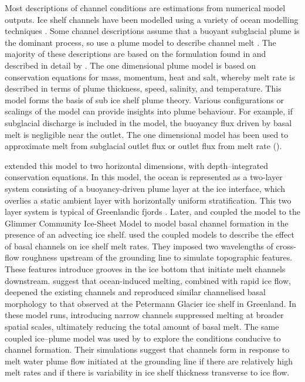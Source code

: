 Most descriptions of channel conditions are estimations from numerical model outputs.
Ice shelf channels have been modelled using a variety of ocean modelling techniques  \citep[e.g.][]{millgate2013effect,gladish2012ice,sergienko2013basal,payne2007numerical}. 
Some channel descriptions assume that a buoyant subglacial plume is the dominant process, so use a plume model to describe channel melt \citep[e.g.][]{gladish2012ice, sergienko2013basal}.
The majority of these descriptions are based on the formulation found in \cite{jenkins2011convection} and described in detail by \cite{hewitt2020subglacial}.
The \cite{jenkins2011convection} one dimensional plume model is based on conservation equations for mass, momentum, heat and salt, whereby melt rate is described in terms of plume thickness, speed, salinity, and temperature. This model forms the basis of sub ice shelf plume theory. Various configurations or scalings of the model can provide insights into plume behaviour. For example, if subglacial discharge is included in the model, the buoyancy flux driven by basal melt is negligible near the outlet. The one dimensional model has been used to approximate melt from subglacial outlet flux \cite[e.g.][]{gourmelen2017channelized} or outlet flux from melt rate (\cite[e.g.][]{marsh2016high}).

\cite{holland2006effects} extended this model to two horizontal dimensions, with depth--integrated conservation equations. In this model, the ocean is represented as a two-layer system consisting of a buoyancy-driven plume layer at the ice interface, which overlies a static  ambient layer with horizontally uniform stratification. This two layer system is typical of Greenlandic fjords \citep{hewitt2020subglacial}.
Later, \cite{gladish2012ice,dallaston2015channelization} and \cite{sergienko2013regular} coupled the model to the Glimmer Community Ice-Sheet Model \citep{rutt2009glimmer} to model basal channel formation in the presence of an advecting ice shelf.
\cite{gladish2012ice} used the coupled models to describe the effect of basal channels on ice shelf melt rates. They imposed two wavelengths of cross-flow  roughness upstream of the grounding line to simulate topographic features. These features introduce grooves in the ice bottom that initiate melt channels downstream. \cite{gladish2012ice} suggest that ocean-induced melting, combined with rapid ice flow, deepened the existing channels and reproduced similar channelised basal morphology to that observed at the Petermann Glacier ice shelf in Greenland. In these model runs, introducing narrow channels suppressed melting at broader spatial scales, ultimately reducing the total amount of basal melt.
The same coupled ice--plume model was used by \cite{sergienko2013basal} to explore the conditions conducive to channel formation.  Their simulations suggest that channels form in response to melt water plume flow initiated at the grounding line if there are relatively high melt rates and if there is variability in ice shelf thickness transverse to ice flow.

